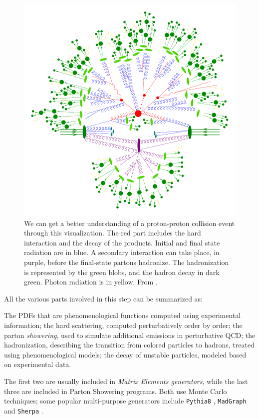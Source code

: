 \begin{figure}
    \centering
     \includegraphics[width=.65\linewidth]{gfx/ch2/event_800px.png}
    \caption[Event generation]{ We can get a better understanding of a proton-proton collision event through this visualization. The red part includes the hard interaction and the decay of the products. Initial and final state radiation are in blue. A secondary
interaction can take place, in purple, before the final-state partons hadronize. The hadronization is
represented by the green blobs, and the hadron decay in dark green. Photon radiation is in yellow. From \cite{evgen}.}
    \label{fig:evgen}
\end{figure}


All the various parts involved in this step can be summarized as:

\begin{outline}
    \1  The PDFs that are phenomenological functions computed using experimental information;
    \1  the hard scattering, computed perturbatively order by order;
    \1  the parton \emph{showering}, used to simulate additional emissions in perturbative QCD;
    \1   the hadronization, describing the transition from colored particles to hadrons, treated
        using phenomenological models;
    \1   the decay of unstable particles, modeled based on experimental data.
    
\end{outline}

The first two are usually included in \emph{Matrix Elements generators}, while the last three are
included in Parton Showering programs. Both use Monte Carlo techniques; some popular multi-purpose generators include \texttt{Pythia8} \cite{Bierlich:2022pfr}, \texttt{MadGraph} \cite{Alwall_2014} and \texttt{Sherpa} \cite{Bothmann_2019}.

